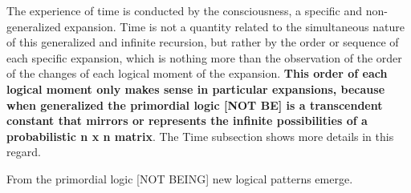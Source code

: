 The experience of time is conducted by the consciousness, a specific and non-generalized expansion. Time is not a quantity related to the simultaneous nature of this generalized and infinite recursion, but rather by the order or sequence of each specific expansion, which is nothing more than the observation of the order of the changes of each logical moment of the expansion. \textbf{This order of each logical moment only makes sense in particular expansions, because when generalized the primordial logic [NOT BE] is a transcendent constant that mirrors or represents the infinite possibilities of a probabilistic n x n matrix}. The Time subsection shows more details in this regard.

From the primordial logic [NOT BEING] new logical patterns emerge.







